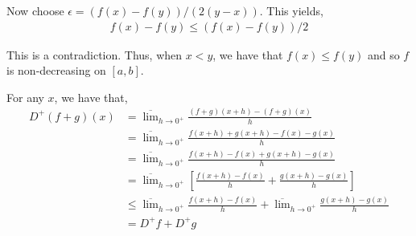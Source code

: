 \documentclass[12pt]{article}
\newenvironment{problem}[2][Problem]{\begin{trivlist}
\item[\hskip \labelsep {\bfseries #1}\hskip \labelsep {\bfseries #2.}]}{\end{trivlist}}
\begin{document}
Now choose $\epsilon = (f(x) - f(y))/(2(y-x))$. This yields,
\begin{align*}
f(x) - f(y) \leq (f(x) - f(y))/2
\end{align*}

This is a contradiction. Thus, when $x < y$, we have that $f(x) \leq f(y)$ and so $f$ is non-decreasing on $[a, b]$.

\begin{problem}{4}
\end{problem}

For any $x$, we have that,
\begin{align*}
D^+(f+g)(x) &= \overline{\lim}_{h \to 0^+} \frac{(f+g)(x+h) - (f+g)(x)}{h}\\
&= \overline{\lim}_{h \to 0^+} \frac{f(x+h) + g(x+h) - f(x) - g(x)}{h}\\
&= \overline{\lim}_{h \to 0^+} \frac{f(x+h) - f(x) + g(x+h) - g(x)}{h}\\
&= \overline{\lim}_{h \to 0^+} \left[\frac{f(x+h) - f(x)}{h} + \frac{g(x+h) - g(x)}{h}\right]\\
&\leq \overline{\lim}_{h \to 0^+} \frac{f(x+h) - f(x)}{h} + \overline{\lim}_{h \to 0^+} \frac{g(x+h) - g(x)}{h}\\
&= D^+f + D^+g
\end{align*}
\end{document}
